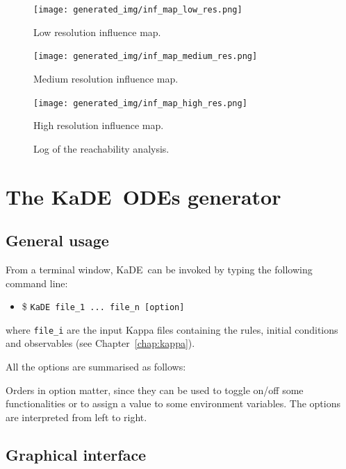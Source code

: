 \documentclass[11pt]{book}
\def\KaDE{\textsf{KaDE}}
\def\ttt#1{\texttt{#1}}
\def\ITE#1{\begin{itemize}#1\end{itemize}}
\begin{document}
\begin{figure}[htbp]
\begin{center}
\texttt{[image: generated\_img/inf\_map\_low\_res.png]}
\caption{Low resolution influence map.}
\label{fig:low-res}
\end{center}
\end{figure}
\begin{figure}[htbp]
\begin{center}
\texttt{[image: generated\_img/inf\_map\_medium\_res.png]}
\caption{Medium resolution influence map.}
\label{fig:medium-res}
\end{center}
\end{figure}
\begin{figure}[htbp]
\begin{center}
\texttt{[image: generated\_img/inf\_map\_high\_res.png]}
\caption{High resolution influence map.}
\label{fig:high-res}
\end{center}
\end{figure}

\begin{figure}[t]

\caption{Log of the reachability analysis.}
\label{fig:reachability_influence}
\end{figure}

\chapter{The \KaDE~ODEs generator}

\section{General usage}

From a terminal window, \KaDE~can be invoked by typing the following command line:
\ITE{
\item[\$] \ttt{KaDE file\_1 ... file\_n  [option]}
}
where \ttt{file\_i} are the input Kappa files containing the rules, initial conditions and observables (see Chapter~\ref{chap:kappa}).

All the options are summarised as follows:


Orders in option matter, since they can be used to toggle on/off some functionalities or to assign a value to some environment variables.
The options are interpreted from left to right.

\section{Graphical interface}
\end{document}
